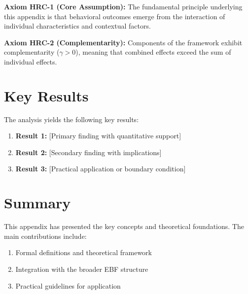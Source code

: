 \begin{tcolorbox}[colback=yellow!5!white,colframe=yellow!75!black,title=Axiom HRC-1: Fundamental Principle]
\textbf{Axiom HRC-1 (Core Assumption):}
The fundamental principle underlying this appendix is that behavioral outcomes
emerge from the interaction of individual characteristics and contextual factors.
\end{tcolorbox}

\begin{tcolorbox}[colback=yellow!5!white,colframe=yellow!75!black,title=Axiom HRC-2: Complementarity]
\textbf{Axiom HRC-2 (Complementarity):}
Components of the framework exhibit complementarity ($\gamma > 0$), meaning
that combined effects exceed the sum of individual effects.
\end{tcolorbox}


\section{Key Results}
\label{sec:hrc-results}

The analysis yields the following key results:

\begin{enumerate}
    \item \textbf{Result 1:} [Primary finding with quantitative support]
    \item \textbf{Result 2:} [Secondary finding with implications]
    \item \textbf{Result 3:} [Practical application or boundary condition]
\end{enumerate}


\section{Summary}
\label{sec:hrc-summary}

This appendix has presented the key concepts and theoretical foundations.
The main contributions include:

\begin{enumerate}
    \item Formal definitions and theoretical framework
    \item Integration with the broader EBF structure
    \item Practical guidelines for application
\end{enumerate}

